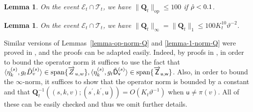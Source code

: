 \documentclass[11pt]{article}
\newtheorem{Lemma}[Theorem]{Lemma}
\numberwithin{equation}{section}
\begin{document}
\begin{Lemma}{\label{lemma-op-norm-Q}}
    On the event $\mathcal{E}_{t} \cap \mathcal{T}_t$, we have $\| \mathbf{Q}_t \|_{\mathrm{op}} \leq 100$ if $\Hat{\rho}<0.1$.
\end{Lemma}
\begin{Lemma}{\label{lemma-1-norm-Q}}
    On the event $\mathcal{E}_{t} \cap \mathcal{T}_t$, we have $\| \mathbf{Q}_t \|_{\infty} = \| \mathbf{Q}_t \|_{1} \leq 100 K_t^{10} \vartheta^{-2}$.
\end{Lemma}
Similar versions of Lemmas~\ref{lemma-op-norm-Q} and \ref{lemma-1-norm-Q} were proved in \cite[Lemmas 3.13 and 3.15]{DL22+}, and the proofs can be adapted easily. Indeed, by proofs in \cite{DL22+}, in order to bound the operator norm it suffices to use the fact that $\langle \eta^{(s)}_k, g_t \Tilde{D}^{(s)}_v \rangle \in \mathrm{span}\{ \overrightarrow{Z}_{u,w} \}, \langle \eta^{(s)}_k, g_t \Tilde{\mathsf{D}}^{(s)}_{\mathsf{v}} \rangle \in \mathrm{span}\{ \overrightarrow{\mathsf{Z}}_{\mathsf{u,w}} \}$. Also, in order to bound the $\infty$-norm, it suffices to show that the operator norm is bounded by a constant and that $\mathbf{Q}^{-1}_t ( (s,k,v);(s^{\prime},k^{\prime},\mathsf{u}) ) = O(K_t \vartheta^{-1})$ when $\mathsf{u} \neq \pi(v)$. All of these can be easily checked and thus we omit further details.
\end{document}
